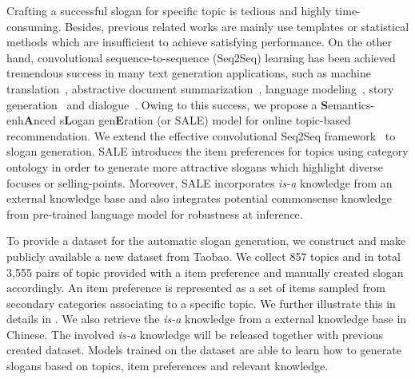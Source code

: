 Crafting a successful slogan for specific topic is tedious and highly time-consuming.
Besides, previous related works are mainly use templates or statistical methods
which are insufficient to achieve satisfying performance.
On the other hand, convolutional sequence-to-sequence (Seq2Seq) learning has been achieved tremendous success in many text generation applications,
such as machine translation~\cite{wang2017statistical,chen2018stable,song2018double,wu2019pay},
abstractive document summarization~\cite{fan2017controllable,liu2018controlling,narayan2018don},
language modeling~\cite{baevski2018adaptive},
story generation~\cite{fan2018hierarchical,fan2019strategies}
and dialogue~\cite{miller2017parlai,dinan2018wizard}.
Owing to this success, we propose a \textbf{S}emantics-enh\textbf{A}nced
s\textbf{L}ogan gen\textbf{E}ration (or SALE) model for online topic-based recommendation.
We extend the effective convolutional Seq2Seq framework~\cite{ott2019fairseq}
to slogan generation.
SALE introduces the item preferences for topics using category ontology
in order to generate more attractive slogans which highlight diverse focuses or selling-points.
Moreover, SALE incorporates \emph{is-a} knowledge
from an external knowledge base and
also integrates potential commonsense knowledge from pre-trained language model for robustness at inference.
 

To provide a dataset for the automatic slogan generation,
we construct and make publicly available a new dataset from Taobao.
We collect 857 topics and in total 3,555 pairs of topic provided with a item preference
and manually created slogan accordingly.
An item preference is represented as a set of items sampled from secondary categories 
associating to a specific topic.
We further illustrate this in details in .
We also retrieve the \emph{is-a} knowledge
from a external knowledge base in Chinese.
The involved \emph{is-a} knowledge will be released together with previous created dataset.
Models trained on the dataset are able to learn how to generate slogans based on topics,
item preferences and relevant knowledge.

